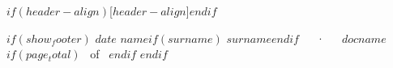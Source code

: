 %
\makecvheader$if(header-align)$[$header-align$]$endif$

$if(show_footer)$
\makecvfooter
  {$date$}
    {$name$$if(surname)$ $surname$$endif$~~~·~~~$docname$}
  {\thepage$if(page_total)$~ of \pageref{LastPage}~$endif$}
$endif$
